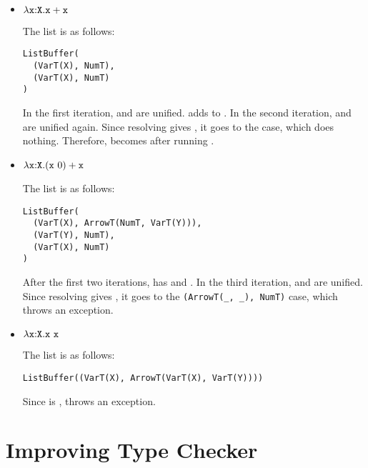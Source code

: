 \begin{itemize}
\item $\lambda\texttt{x}{:}\texttt{X}.\texttt{x}+\texttt{x}$

The  list is as follows:

\begin{verbatim}
ListBuffer(
  (VarT(X), NumT),
  (VarT(X), NumT)
)
\end{verbatim}

    In the first iteration,  and  are unified.
     adds  to . In the second
    iteration,  and  are unified again. Since
    resolving  gives , it goes to the  case, which does nothing. Therefore,  becomes
     after running .

\item $\lambda\texttt{x}{:}\texttt{X}.(\texttt{x}\ 0)+\texttt{x}$

The  list is as follows:

\begin{verbatim}
ListBuffer(
  (VarT(X), ArrowT(NumT, VarT(Y))),
  (VarT(Y), NumT),
  (VarT(X), NumT)
)
\end{verbatim}

    After the first two iterations,  has  and . In the third iteration,
     and  are unified. Since resolving
     gives , it goes to the
    \verb!(ArrowT(_, _), NumT)! case, which throws an exception.

\item $\lambda\texttt{x}{:}\texttt{X}.\texttt{x}\ \texttt{x}$

The  list is as follows:

\begin{verbatim}
ListBuffer((VarT(X), ArrowT(VarT(X), VarT(Y))))
\end{verbatim}

    Since  is
    ,  throws an exception.

\end{itemize}

\section{Improving Type Checker}

